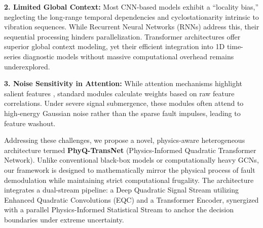 \documentclass[5p,times,twocolumn]{elsarticle}
\begin{document}
\textbf{2. Limited Global Context:} Most CNN-based models exhibit a ``locality bias,'' neglecting the long-range temporal dependencies and cyclostationarity intrinsic to vibration sequences. While Recurrent Neural Networks (RNNs) \cite{P9_Yu, P17_Yin} address this, their sequential processing hinders parallelization. Transformer architectures offer superior global context modeling, yet their efficient integration into 1D time-series diagnostic models without massive computational overhead remains underexplored.

\textbf{3. Noise Sensitivity in Attention:} While attention mechanisms highlight salient features \cite{P12_Yang, P40_Wang}, standard modules calculate weights based on raw feature correlations. Under severe signal submergence, these modules often attend to high-energy Gaussian noise rather than the sparse fault impulses, leading to feature washout.

Addressing these challenges, we propose a novel, physics-aware heterogeneous architecture termed \textbf{PhyQ-TransNet} (Physics-Informed Quadratic Transformer Network). Unlike conventional black-box models or computationally heavy GCNs, our framework is designed to mathematically mirror the physical process of fault demodulation while maintaining strict computational frugality. The architecture integrates a dual-stream pipeline: a Deep Quadratic Signal Stream utilizing Enhanced Quadratic Convolutions (EQC) and a Transformer Encoder, synergized with a parallel Physics-Informed Statistical Stream to anchor the decision boundaries under extreme uncertainty. 
\end{document}
